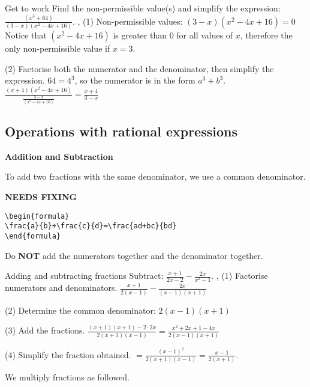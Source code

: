 \begin{example}{Get to work}
Find the non-permissible value(s) and simplify the expression: $\frac{\left(x^{3}+64\right)}{(3-x)\left(x^{2}-4x+16\right)}$.
\sep
(1) Non-permissible values: $(3-x)\left(x^{2}-4x+16\right)=0$
Notice that $\left(x^{2}-4x+16\right)$ is greater than 0 for all values of $x$, therefore the only non-permissible value if $x=3$.

(2) Factorise both the numerator and the denominator, then simplify the expression. $64=4^{3}$, so the numerator is in the form $a^{3}+b^{3}$.
$\frac{(x+4)\left(x^{2}-4x+16\right)}{\frac{3-x}{\left(x^{2}-4x+16\right)}}=\frac{x+4}{3-x}$
\end{example}

\subsection{Operations with rational expressions}
\textbf{Addition and Subtraction}

To add two fractions with the same denominator, we use a common denominator.

{\hfill\Large\bfseries NEEDS FIXING\hfill}
\begin{lstlisting}
\begin{formula}
\frac{a}{b}+\frac{c}{d}=\frac{ad+bc}{bd}
\end{formula}
 \end{lstlisting} %
Do \textbf{NOT} add the numerators together and the denominator together. %

\begin{example}{Adding and subtracting fractions}
Subtract: $\frac{x+1}{2x-2}-\frac{2x}{x^{2}-1}$.
\sep
(1) Factorise numerators and denominators.
$\frac{x+1}{2(x-1)}-\frac{2x}{(x-1)(x+1)}$

(2) Determine the common denominator: $2(x-1)(x+1)$

(3) Add the fractions.
$\frac{(x+1)(x+1)-2 \cdot 2x}{2(x+1)(x-1)}=\frac{x^{2}+2x+1-4x}{2(x-1)(x+1)}$

(4) Simplify the fraction obtained.
$=\frac{(x-1)^{2}}{2(x+1)(x-1)}=\frac{x-1}{2(x+1)}$.
\end{example}

We multiply fractions as followed.

